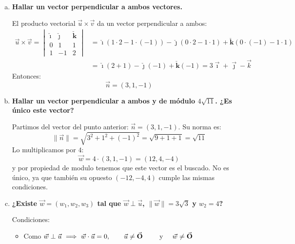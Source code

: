 \documentclass[11pt,a4paper]{article}
\newcommand{\R}{\mathbb{R}}
\newcommand{\iv}{\bm{\check{\imath}}}
\newcommand{\jv}{\bm{\check{\jmath}}}
\newcommand{\kv}{\check{\bm k}}
\newcommand{\indicador}[4]{
{\tikz[remember picture,overlay]\coordinate (#1) at #2;}{\tikz[remember picture,overlay]\coordinate (#3) at #4;} 
}
\newcommand{\marka}[2]{
{\tikz[remember picture,overlay]\coordinate (#1) at #2;}
}
\begin{document}
\begin{enumerate}[\hspace{-5mm} 1) ]
\begin{enumerate}[a)]
 \noindent   Por lo tanto, los vectores que cumplen son:
    \[
    \vec{w} = (-3z, -z, z), \quad z \in \R-\{0\} . 
    \]

\medskip


    \item \textbf{Hallar un vector perpendicular a ambos vectores.}

    El producto vectorial $\vec{u} \times \vec{v}$ da un vector perpendicular a ambos:
    \begin{align*}
    \vec{u} \times \vec{v} = 
    \begin{vmatrix}
    \iv & \jv & \kv \\
    0 & 1 & 1 \\
    1 & -1 & 2
    \end{vmatrix}
    &= \iv (1 \cdot 2 - 1 \cdot (-1)) - \jv (0 \cdot 2 - 1 \cdot 1) + \kv (0 \cdot (-1) - 1 \cdot 1)
    \\ 
    &=
    \iv (2 + 1) - \jv  (-1) + \kv (-1) = 3\vec{\imath} + \vec{\jmath} - \vec{k}         
    \end{align*}
    Entonces:
    \[
    \vec{n} = (3, 1, -1)
    \]

\medskip


    \item \textbf{Hallar un vector perpendicular a ambos y de módulo $4\sqrt{11}$. ¿Es único este vector?}

    Partimos del vector del punto anterior: $\vec{n} = (3,1,-1)$. Su norma es:
    \[
    \|\vec{n}\| = \sqrt{3^2 + 1^2 + (-1)^2} = \sqrt{9 + 1 + 1} = \sqrt{11}
    \]
    Lo multiplicamos por $4$:
    \[
    \vec{w} = 4 \cdot (3,1,-1) = (12,4,-4)
    \]
y por propiedad de modulo tenemos que este vector es el buscado. No es único, ya que también su opuesto $(-12,-4,4)$ cumple las mismas condiciones.

\medskip


    \item \textbf{¿Existe $\vec{w} = (w_1, w_2, w_3)$ tal que $\vec{w} \perp \vec{u}$, $\|\vec{w}\| = 3\sqrt{3}$ y $w_2 = 4$?}

    Condiciones:

\begin{itemize} 

    \item Como $\vec{w} \perp \vec{u} \ \Longrightarrow \ 
     \vec{w} \cdot \vec{u} =\marka{A}{(-.1,-.15)}\indicador{X}{(-.2,-.6)}{Y}{(2.3,-.9)}  0 , \qquad \vec{u} \neq \vec{\bf O}
     \qquad$ y $\quad  \vec{w} \neq \vec{\bf O}
    $ 


\end{itemize}
\end{enumerate}
\end{enumerate}
\end{document}
